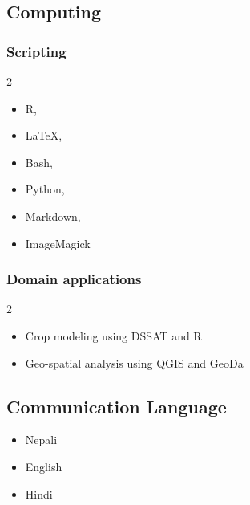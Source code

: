 \documentclass[11pt,a4paper,]{awesome-cv}
\providecommand{\tightlist}{%
	\setlength{\itemsep}{0pt}\setlength{\parskip}{0pt}}
\begin{document}
\hypertarget{computing}{%
\subsection{Computing}\label{computing}}

\hypertarget{scripting}{%
\subsubsection*{Scripting}\label{scripting}}

\begin{multicols}{2}
\begin{itemize}
\item R, 
\item \LaTeX,
\item Bash,
\item Python,
\item Markdown,
\item ImageMagick
\end{itemize}
\end{multicols}

\hypertarget{domain-applications}{%
\subsubsection*{Domain applications}\label{domain-applications}}

\begin{multicols}{2}
\begin{itemize}
\item Crop modeling using DSSAT and R
\item Geo-spatial analysis using QGIS and GeoDa
\end{itemize}
\end{multicols}

\hypertarget{communication-language}{%
\subsection{Communication Language}\label{communication-language}}

\begin{itemize}
\tightlist
\item
  Nepali
\item
  English
\item
  Hindi
\end{itemize}
\end{document}
